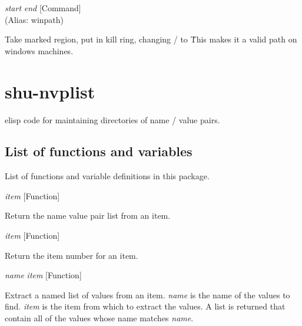 \vspace{1em}
\noindent
{}
\usebox{\funcname}\emph{start} \emph{end}
 \hfill [Command]\\%
 (Alias: winpath)

\begin{doc-string}
Take marked region, put in kill ring, changing / to \.
This makes it a valid path on windows machines.
\end{doc-string}

\eject
\section{shu-nvplist}


elisp code for maintaining directories of name / value pairs.


\subsection{List of functions and variables}

List of functions and variable definitions in this package.



\vspace{1em}
\noindent
{}
\usebox{\funcname}\emph{item}
 \hfill [Function]

\begin{doc-string}
Return the name value pair list from an item.
\end{doc-string}

\vspace{1em}
\noindent
{}
\usebox{\funcname}\emph{item}
 \hfill [Function]

\begin{doc-string}
Return the item number for an item.
\end{doc-string}

\vspace{1em}
\noindent
{}
\usebox{\funcname}\emph{name} \emph{item}
 \hfill [Function]

\begin{doc-string}
Extract a named list of values from an item.  \emph{name} is the name of the values to
find.  \emph{item} is the item from which to extract the values.  A list is returned that contain
all of the values whose name matches \emph{name}.
\end{doc-string}

